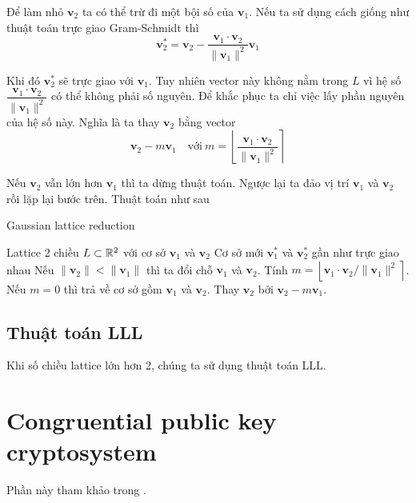 Để làm nhỏ $\bm{v}_2$ ta có thể trừ đi một bội số của $\bm{v}_1$. Nếu ta sử dụng cách giống như thuật toán trực giao Gram-Schmidt thì
\begin{equation*}
    \bm{v}_2^* = \bm{v}_2 - \dfrac{\bm{v}_1 \cdot \bm{v}_2}{\lVert \bm{v}_1 \rVert^2} \bm{v}_1
\end{equation*}

Khi đó $\bm{v}_2^*$ sẽ trực giao với $\bm{v}_1$. Tuy nhiên vector này không nằm trong $L$ vì hệ số $\dfrac{\bm{v}_1 \cdot \bm{v}_2}{\lVert \bm{v}_1 \rVert^2}$ có thể không phải số nguyên. Để khắc phục ta chỉ việc lấy phần nguyên của hệ số này. Nghĩa là ta thay $\bm{v}_2$ bằng vector
\begin{equation*}
    \bm{v}_2 - m \bm{v}_1 \quad \text{với}\ m = \left\lfloor \dfrac{\bm{v}_1 \cdot \bm{v}_2}{\lVert \bm{v}_1 \rVert^2} \right\rceil
\end{equation*}

Nếu $\bm{v}_2$ vẫn lớn hơn $\bm{v}_1$ thì ta dừng thuật toán. Ngược lại ta đảo vị trí $\bm{v}_1$ và $\bm{v}_2$ rồi lặp lại bước trên. Thuật toán như sau

\begin{algorithm}[htb]
    \caption{Gaussian lattice reduction}
    \begin{algorithmic}  
        \Require Lattice 2 chiều $L \subset \mathbb{R}^2$ với cơ sở $\bm{v}_1$ và $\bm{v}_2$
        \Ensure Cơ sở mới $\bm{v}_1^*$ và $\bm{v}_2^*$ gần như trực giao nhau
        \State Nếu $\lVert \bm{v}_2 \rVert < \lVert \bm{v}_1 \rVert$ thì ta đổi chỗ $\bm{v}_1$ và $\bm{v}_2$.
        \State Tính $m = \left\lfloor \bm{v}_1 \cdot \bm{v}_2 / \lVert \bm{v}_1 \rVert^2 \right\rceil$.
        \State Nếu $m = 0$ thì trả về cơ sở gồm $\bm{v}_1$ và $\bm{v}_2$.
        \State Thay $\bm{v}_2$ bởi $\bm{v}_2 - m \bm{v}_1$.
    \end{algorithmic}
\end{algorithm}

\subsection*{Thuật toán LLL}

Khi số chiều lattice lớn hơn 2, chúng ta sử dụng thuật toán LLL.

\section{Congruential public key cryptosystem}

Phần này tham khảo trong \cite{Hoffstein2014}.


